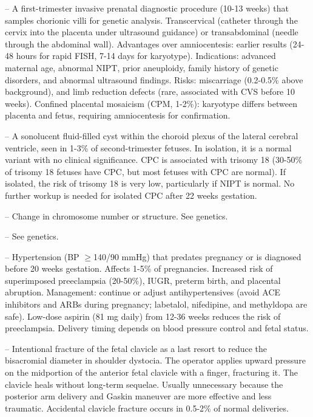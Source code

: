 -- A first-trimester invasive prenatal diagnostic procedure (10-13 weeks) that samples chorionic villi for genetic analysis. Transcervical (catheter through the cervix into the placenta under ultrasound guidance) or transabdominal (needle through the abdominal wall). Advantages over amniocentesis: earlier results (24-48 hours for rapid FISH, 7-14 days for karyotype). Indications: advanced maternal age, abnormal NIPT, prior aneuploidy, family history of genetic disorders, and abnormal ultrasound findings. Risks: miscarriage (0.2-0.5\% above background), and limb reduction defects (rare, associated with CVS before 10 weeks). Confined placental mosaicism (CPM, 1-2\%): karyotype differs between placenta and fetus, requiring amniocentesis for confirmation.

-- A sonolucent fluid-filled cyst within the choroid plexus of the lateral cerebral ventricle, seen in 1-3\% of second-trimester fetuses. In isolation, it is a normal variant with no clinical significance. CPC is associated with trisomy 18 (30-50\% of trisomy 18 fetuses have CPC, but most fetuses with CPC are normal). If isolated, the risk of trisomy 18 is very low, particularly if NIPT is normal. No further workup is needed for isolated CPC after 22 weeks gestation.

-- Change in chromosome number or structure. See genetics.

-- See genetics.

-- Hypertension (BP \(\ge\)140/90 mmHg) that predates pregnancy or is diagnosed before 20 weeks gestation. Affects 1-5\% of pregnancies. Increased risk of superimposed preeclampsia (20-50\%), IUGR, preterm birth, and placental abruption. Management: continue or adjust antihypertensives (avoid ACE inhibitors and ARBs during pregnancy; labetalol, nifedipine, and methyldopa are safe). Low-dose aspirin (81 mg daily) from 12-36 weeks reduces the risk of preeclampsia. Delivery timing depends on blood pressure control and fetal status.

-- Intentional fracture of the fetal clavicle as a last resort to reduce the bisacromial diameter in shoulder dystocia. The operator applies upward pressure on the midportion of the anterior fetal clavicle with a finger, fracturing it. The clavicle heals without long-term sequelae. Usually unnecessary because the posterior arm delivery and Gaskin maneuver are more effective and less traumatic. Accidental clavicle fracture occurs in 0.5-2\% of normal deliveries.

